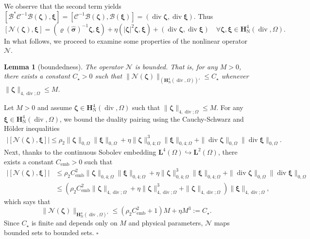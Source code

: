 \documentclass[fleqn,a4paper]{cas-sc}
\newcommand\vdiv{\mathop{\mathrm{div}}\nolimits}
\newcommand{\bxi}{\boldsymbol{\xi}}
\newcommand{\bzeta}{\boldsymbol{\zeta}}
\newcommand{\0}{\boldsymbol{0}}
\newcommand\cC{\mathcal{C}}
\newcommand\cN{\mathcal{N}}
\newcommand\bH{\mathbf{H}}
\newcommand\bsigma{\boldsymbol{\sigma}}
\numberwithin{equation}{section}
\numberwithin{figure}{section}
\newtheorem{lemma}[theorem]{Lemma}
\newenvironment{proof}{\noindent{\it Proof.}}{\hfill$\square$}
\begin{document}
We observe that the second term yields $[\mathcal{B}^* \cC^{-1} \mathcal{B}(\bzeta), \bxi] = [\cC^{-1} \mathcal{B}(\bzeta), \mathcal{B}(\bxi)] = (\vdiv \bzeta, \vdiv \bxi)$. Thus
\begin{equation} \label{eq:def_N_variational}
    [\cN(\bzeta), \bxi] = (\varrho(\widehat{\bsigma})^{-1}\bzeta, \bxi) + \eta (|\bzeta|^2\bzeta, \bxi) + (\vdiv \bzeta, \vdiv \bxi) \quad \forall \bzeta, \bxi \in \bH^4_{\mathrm{N}}(\vdiv,\Omega).
\end{equation}
In what follows, we proceed to examine some properties of the nonlinear operator $\cN$. 
\begin{lemma}[boundedness]\label{lem:boundedness}
    The operator $\cN$ is bounded. That is, for any $M > 0$, there exists a constant $C_\star > 0$ such that $\|\cN(\bzeta)\|_{(\bH^4_{\mathrm{N}}(\vdiv,\Omega))'} \le C_\star$ whenever $\|\bzeta\|_{{{4,\vdiv;\Omega}}} \le M$.
\end{lemma}
\begin{proof}
    Let $M > 0$ and assume $\bzeta \in\bH^4_{\mathrm{N}}(\vdiv,\Omega)$ such that $\|\bzeta\|_{{4,\vdiv;\Omega}} \le M$. For any $\bxi \in \bH^4_{\mathrm{N}}(\vdiv,\Omega)$, we bound the duality pairing using the Cauchy-Schwarz and Hölder inequalities
    \begin{align*}
        |[\cN(\bzeta), \bxi]|
        \le \rho_2 \|\bzeta\|_{0, \Omega} \|\bxi\|_{0, \Omega} + \eta \|\bzeta\|_{0,4;\Omega}^3 \|\bxi\|_{0,4;\Omega} + \|\vdiv \bzeta\|_{0,\Omega} \|\vdiv \bxi\|_{0,\Omega}.
    \end{align*}
    Next, thanks to the continuous Sobolev embedding $\mathbf{L}^4(\Omega) \hookrightarrow \mathbf{L}^2(\Omega)$, there exists a constant $C_{\text{emb}} > 0$ such that
    \begin{align*}
        |[\cN(\bzeta), \bxi]| &\le \rho_2 C_{\text{emb}}^2 \|\bzeta\|_{0,4;\Omega} \|\bxi\|_{0,4;\Omega} + \eta \|\bzeta\|_{0,4;\Omega}^3 \|\bxi\|_{0,4;\Omega} + \|\vdiv \bzeta\|_{0,\Omega} \|\vdiv \bxi\|_{0,\Omega} \\
        &\le \left( \rho_2 C_{\text{emb}}^2 \|\bzeta\|_{{4,\vdiv;\Omega}} + \eta \|\bzeta\|_{{4,\vdiv;\Omega}}^3 + \|\bzeta\|_{{4,\vdiv;\Omega}} \right) \|\bxi\|_{{4,\vdiv;\Omega}},
    \end{align*}
    which says that
    \begin{equation*}
        \|\cN(\bzeta)\|_{\bH^4_{\mathrm{N}}(\vdiv,\Omega)'} \le (\rho_2 C_{\text{emb}}^2 + 1) M + \eta M^3 := C_\star.
    \end{equation*}
    Since $C_\star$ is finite and depends only on $M$ and physical parameters, $\cN$ maps bounded sets to bounded sets.
\end{proof}
\end{document}
